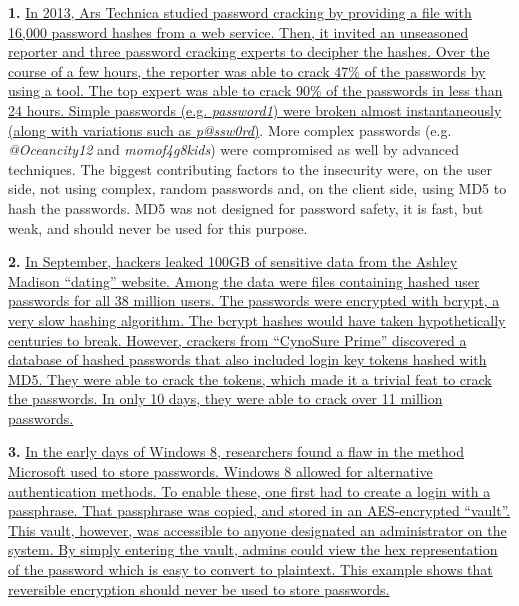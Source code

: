 \documentclass[12pt]{extarticle}
\begin{document}
\noindent\textbf{1. }\href{http://arstechnica.com/security/2013/05/how-crackers-make-minced-meat-out-of-your-passwords/1/}{In 2013, Ars Technica studied password cracking by providing a file with 16,000 password hashes from a web service. Then, it invited an unseasoned reporter and three password cracking experts to decipher the hashes. Over the course of a few hours, the reporter was able to crack 47\% of the passwords by using a tool. The top expert was able to crack 90\% of the passwords in less than 24 hours. Simple passwords (e.g. \textit{password1}) were broken almost instantaneously (along with variations such as \textit{p@ssw0rd})}. More complex passwords (e.g. \textit{@Oceancity12} and \textit{momof4g8kids}) were compromised as well by advanced techniques. The biggest contributing factors to the insecurity were, on the user side, not using complex, random passwords and, on the client side, using MD5 to hash the passwords. MD5 was not designed for password safety, it is fast, but weak, and should never be used for this purpose.\newline

\noindent\textbf{2. }\href{http://thehackernews.com/2015/09/ashley-madison-password-cracked.html}{In September, hackers leaked 100GB of sensitive data from the Ashley Madison ``dating'' website. Among the data were files containing hashed user passwords for all 38 million users. The passwords were encrypted with bcrypt, a very slow hashing algorithm. The bcrypt hashes would have taken hypothetically centuries to break. However, crackers from ``CynoSure Prime'' discovered a database of hashed passwords that also included login key tokens hashed with MD5. They were able to crack the tokens, which made it a trivial feat to crack the passwords. In only 10 days, they were able to crack over 11 million passwords.}\newline

\noindent\textbf{3. }\href{http://www.hotforsecurity.com/blog/windows-8-stores-logon-passwords-in-plain-text-3914.html}{In the early days of Windows 8, researchers found a flaw in the method Microsoft used to store passwords. Windows 8 allowed for alternative authentication methods. To enable these, one first had to create a login with a passphrase. That passphrase was copied, and stored in an AES-encrypted ``vault''. This vault, however, was accessible to anyone designated an administrator on the system. By simply entering the vault, admins could view the hex representation of the password which is easy to convert to plaintext. This example shows that reversible encryption should never be used to store passwords.}
\end{document}
